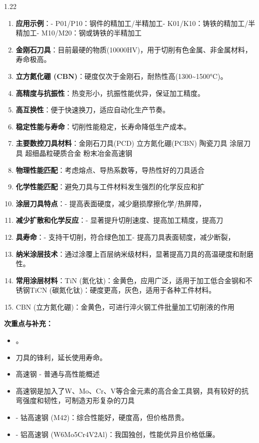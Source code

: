 \documentclass[12pt,a4paper]{article}
\begin{document}
\begin{spacing}{1.22}
\begin{tcolorbox}[colback=yellow!6,colframe=red!55!black,title=重点,left=1mm,right=1mm]
\begin{enumerate}[leftmargin=2.2em,label=\arabic*.]
  \item \textbf{应用示例}：- P01/P10：钢件的精加工/半精加工- K01/K10：铸铁的精加工/半精加工- M10/M20：钢或铸铁的半精加工
  \item \textbf{金刚石刀具}：目前最硬的物质(10000HV)，用于切削有色金属、非金属材料，寿命极高。
  \item \textbf{立方氮化硼 (CBN)}：硬度仅次于金刚石，耐热性高(1300\textasciitilde{}1500°C)。
  \item \textbf{高精度与抗振性}：热变形小，抗振性能优异，保证加工精度。
  \item \textbf{高互换性}：便于快速换刀，适应自动化生产节奏。
  \item \textbf{稳定性能与寿命}：切削性能稳定，长寿命降低生产成本。
  \item \textbf{主要数控刀具材料}：金刚石刀具(PCD) 立方氮化硼(PCBN) 陶瓷刀具 涂层刀具 超细晶粒硬质合金 粉末冶金高速钢
  \item \textbf{物理性能匹配}：考虑熔点、导热系数等，导热性好的刀具适合
  \item \textbf{化学性能匹配}：避免刀具与工件材料发生强烈的化学反应和扩
  \item \textbf{涂层刀具特点}：- 提高表面硬度，减少磨损摩擦化学/热屏障，
  \item \textbf{减少扩散和化学反应}：- 显著提升切削速度、提高加工精度，提高刀
  \item \textbf{具寿命}：- 支持干切削，符合绿色加工- 提高刀具表面韧度，减少断裂，
  \item \textbf{纳米涂层技术}：通过涂覆上百层纳米级材料，显著提高刀具的高温硬度和耐磨性。
  \item \textbf{常用涂层材料}：TiN (氮化钛)：金黄色，应用广泛，适用于加工低合金钢和不锈钢TiCN (碳氮化钛)：硬度更高，灰色，适用于各种工件材料。
  \item CBN (立方氮化硼)：金黄色，可进行淬火钢工件批量加工切削液的作用
\end{enumerate}
\end{tcolorbox}
\noindent\textbf{次重点与补充：}
\begin{itemize}[leftmargin=2.2em,label=--]
  \item 。
  \item 刀具的锋利，延长使用寿命。
  \item 高速钢 - 普通与高性能概述
  \item 高速钢是加入了W、Mo、Cr、V等合金元素的高合金工具钢，具有较好的抗弯强度和韧性，可制造刃形复杂的刀具
  \item - 钴高速钢 (M42)：综合性能好，硬度高，但价格昂贵。
  \item - 铝高速钢 (W6Mo5Cr4V2Al)：我国独创，性能优异且价格低廉。

\end{itemize}
\end{spacing}
\end{document}

